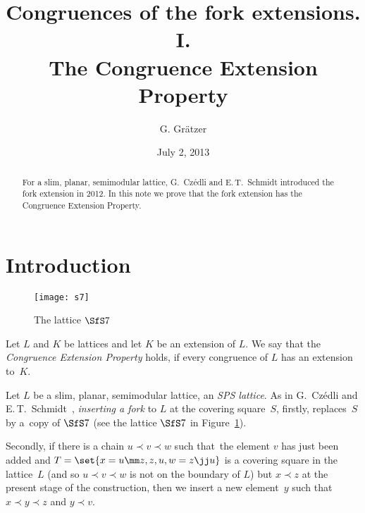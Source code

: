 \documentclass{amsart}
\theoremstyle{plain}
\theoremstyle{definition}
\begin{document}
\title[Congruences of the fork extensions. I. CEP]
{Congruences of the fork extensions. I.\\
The Congruence Extension Property}  
\author{G. Gr\"{a}tzer} 
\address{Department of Mathematics\\
  University of Manitoba\\
  Winnipeg, MB R3T 2N2\\
  Canada}

\date{July 2, 2013}

\begin{abstract}
For a slim, planar, semimodular lattice, 
G.~Cz\'edli and E.\,T.~Schmidt introduced the fork extension in 2012.
In this note we prove that 
the fork extension has the Congruence Extension Property.
\end{abstract}

\maketitle

\section{Introduction}\label{S:Introduction}

\begin{figure}[b]
\centerline{\texttt{[image: s7]}}
\caption{The lattice $\SfS 7$}\label{F:s7}
\end{figure}

Let $L$ and $K$ be lattices and let $K$ be an extension of $L$.
We say that the \emph{Congruence Extension Property} holds, 
if every congruence of $L$ has an extension to~$K$.

Let $L$ be a slim, planar, semimodular lattice, an \emph{SPS lattice}.
As in G.~Cz\'edli and E.\,T.~Schmidt~\cite{CSb}, 
\emph{inserting a fork} to $L$ at the covering square~$S$, 
firstly, replaces~$S$ by a~copy of $\SfS 7$ 
(see the lattice $\SfS 7$ in Figure~\ref{F:s7}). 

Secondly, if there is a chain 
$u\prec v\prec w$ such that~the element $v$ has just been added 
and 
$
   T = \set{x=u \mm z, z, u, w=z \jj u}
$
is a covering square in the lattice~$L$ 
(and so $u \prec v \prec w$ is not on the boundary of $L$) 
but $x \prec z$ at the present stage of the construction,
then we insert a new element~$y$ 
such that $x \prec y \prec z$ and $y \prec v$.
\end{document}
